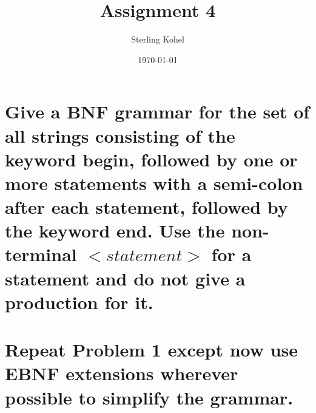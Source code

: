 \documentclass[11pt]{article}
\title{\textbf{Assignment 4}}
\author{Sterling Kohel}
\date{\today}
\begin{document}
\raggedright
\maketitle

\section{Give a BNF grammar for the set of all strings consisting of the keyword begin, followed by one or more statements with
a semi-colon after each statement, followed by the keyword end. Use the non-terminal $<statement>$ for a statement
and do not give a production for it.}

\begin{center} 
\end{center}


\section{Repeat Problem 1 except now use EBNF extensions wherever possible to simplify the grammar.}


\begin{center} 
\end{center}
\end{document}
